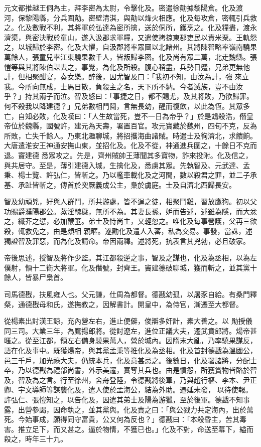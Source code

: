 \begin{pinyinscope}
 元文都推越王侗為主，拜李密為太尉，令擊化及。密遣徐勣據黎陽倉。化及渡
 河，保黎陽縣，分兵圍勣。密壁清淇，與勣以烽火相應。化及每攻倉，密輒引兵救之。化及數戰不利，其將軍於弘達為密所擒，送於侗所，鑊烹之。化及糧盡，渡永濟渠，與密決戰於童山，遂入汲郡求軍糧，又遣使拷掠東郡吏民以責米粟。王軌怨之，以城歸於李密。化及大懼，自汲郡將率眾圖以北諸州。其將陳智略率嶺南驍果萬餘人，張童兒率江東驍果數千人，皆叛歸李密。化及尚有眾二萬，北走魏縣。張愷等與其將陳伯謀去之，事覺，為化及所殺。腹心稍盡，兵勢日蹙，兄弟更無他計，但相聚酣宴，奏女樂。醉後，因尤智及曰：「我初不知，由汝為計，強
 來立我。今所向無成，士馬日散，負殺主之名，天下所不納。今者滅族，豈不由汝乎？」持其兩子而泣。智及怒曰：「事捷之日，都不賜尤，及其將敗，乃欲歸罪。何不殺我以降建德？」兄弟數相鬥鬩，言無長幼，醒而復飲，以此為恆。其眾多亡，自知必敗，化及嘆曰：「人生故當死，豈不一日為帝乎？」於是鴆殺浩，僭皇帝位於魏縣，國號許，建元為天壽，署置百官。攻元寶藏於魏州，四旬不克，反為所敗，亡失千餘人。乃東北趣聊城，將招攜海曲諸賊。時遣士及徇濟北，求饋餉。大唐遣淮安王神通安撫山東，並招化及。化及不從，神通進兵圍之，十餘日不克而退。竇建德
 悉眾攻之。先是，齊州賊帥王薄聞其多寶物，詐來投附。化及信之，與共居守。至是，薄引建德入城，生擒化及，悉虜其眾。先執智及、元武達、孟秉、楊士覽、許弘仁，皆斬之。乃以轞車載化及之河間，數以殺君之罪，並二子承基、承趾皆斬之，傳首於突厥義成公主，梟於虜庭。士及自濟北西歸長安。



 智及幼頑兇，好與人群鬥，所共游處，皆不逞之徒，相聚鬥雞，習放鷹狗。初以父功賜爵濮陽郡公。蒸淫醜穢，無所不為。其妻長孫，妒而告述，述雖為隱，而大忿之，纖芥之愆，必加鞭箠。弟士及恃尚主，又輕忽之。唯化及每事營護，父再三欲殺，輒救免之，由是頗相
 親暱。遂勸化及遣人入蕃，私為交易。事發，當誅，述獨證智及罪惡，而為化及請命。帝因兩釋。述將死，抗表言其兇勃，必且破家。



 帝後思述，授智及將作少監。其江都殺逆之事，智及之謀也，化及為丞相，以為左僕射，領十二衛大將軍。化及僭號，封齊王。竇建德破聊城，獲而斬之，並其黨十餘人，皆暴尸梟首。



 司馬德戡，扶風雍人也。父元謙，仕周為都督。德戡幼孤，以屠豕自給。有桑門釋粲，通德戡母和氏，遂撫教之，因解書計。開皇中，為侍官，漸遷至大都督。



 從楊素出討漢王諒，充內營左右，進止便僻，俊辯多奸計，素大善之。以
 勛授儀同三司。大業三年，為鷹揚郎將。從討遼左，進位正議大夫，遷武賁郎將。煬帝甚暱之。從至江都，領左右備身驍果萬人，營於城內。因隋末大亂，乃率驍果謀反，語在化及事中。既獲煬帝，與其黨孟秉等推化及為丞相。化及首封德戡為溫國公，邑三千戶，加光祿大夫，仍統本兵，化及意甚忌之。後數日，化及署諸將，分配士卒，乃以德戡為禮部尚書，外示美遷，實奪其兵也。由是憤怨，所獲賞物皆賂於智及，智及為之言。行至徐州，舍舟登陸，令德戡將後軍，乃與趙行樞、李本、尹正卿、宇文導師等謀襲化及，遣人使於孟海公，結為外助。遷延未發，
 以待使報。許弘仁、張愷知之，以告化及，因遣其弟士及陽為游獵，至於後軍。德戡不知事露，出營參謁，因命執之，並其黨與。化及責之曰：「與公戮力共定海內，出於萬死。今始事成，願得同守富貴，公又何為反也？」德戡曰：「本殺昏主，苦其毒害。推立足下，而又甚之。逼於物情，不獲已也。」化及不對，命送至幕下，縊而殺之，時年三十九。




\end{pinyinscope}
